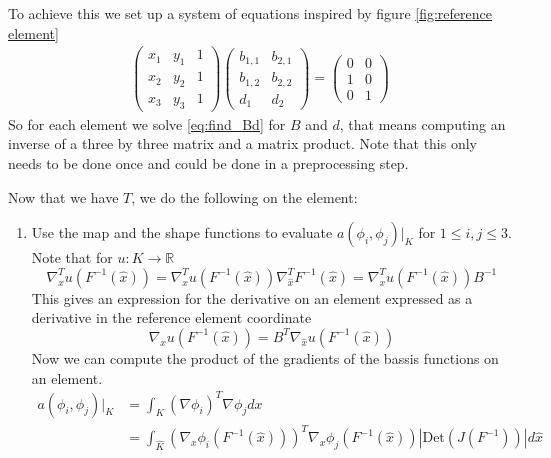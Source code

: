 \documentclass[../Main/main.tex]{subfiles}
\begin{document}
\begin{enumerate}
		To achieve this we set up a system of equations inspired by figure \ref{fig:reference element}
		\begin{gather}\label{eq:find_Bd}
			\begin{pmatrix}
				x_1 & y_1 & 1\\ 
				x_2 & y_2 & 1\\ 
				x_3 & y_3 & 1
			\end{pmatrix}\begin{pmatrix}
				b_{1,1} & b_{2,1}\\ 
				b_{1,2} & b_{2,2}\\ 
				d_1 & d_2
			\end{pmatrix}=
			\begin{pmatrix}
				0 &0 \\ 
				1& 0\\ 
				0 &1 
			\end{pmatrix}
		\end{gather}
		So for each element we solve \eqref{eq:find_Bd} for $B$ and $d$, that means computing an inverse of a three by three matrix and a matrix product. Note that this only needs to be done once and could be done in a preprocessing step. \par
		Now that we have $T$, we do the following on the element:
		\begin{enumerate}
					\item Use the map and the shape functions to evaluate $a(\phi_i,\phi_j)|_K$  for $1\leq i,j \leq 3$. Note that for $u: K \rightarrow \mathbb{R}$
			\begin{equation}
				\nabla^T_{\hat{x}} u(F^{-1}(\hat{x})) = \nabla^T_{x}u(F^{-1}(\hat{x}))\nabla^T_{\hat{x}} F^{-1}(\hat{x}) =\nabla^T_{x}u(F^{-1}(\hat{x})) B^{-1}
			\end{equation}
			This gives an expression for the derivative on an element expressed as a derivative in the reference element coordinate
			\begin{equation}
				\nabla_{x}u(F^{-1}(\hat{x})) = B^T \nabla_{\hat{x}} u(F^{-1}(\hat{x}))
			\end{equation}
			Now we can compute the product of the gradients of the bassis functions on an element.
			\begin{equation}\label{eq:elementgradient}
				\begin{aligned}
					a(\phi_i,\phi_j)|_K &= \int_K (\nabla \phi_i)^T \nabla \phi_j dx\\
					&= \int_{\hat{K}} (\nabla_x \phi_i(F^{-1}(\hat{x})))^T\nabla_x \phi_j(F^{-1}(\hat{x})) |\text{Det}(J(F^{-1}))|d\hat{x}\\

\end{aligned}
\end{equation}
\end{enumerate}
\end{enumerate}
\end{document}
